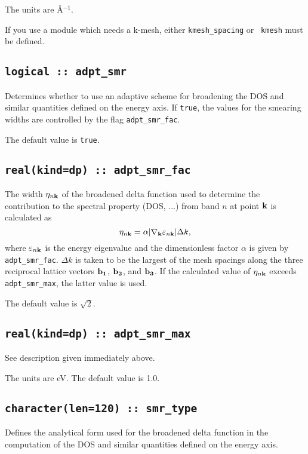 The units are \AA$^{-1}$.

If you use a module which needs a k-mesh, either {\tt kmesh\_spacing} or {\tt
  kmesh} must be defined.

\subsection[adpt\_smr]{\tt logical :: adpt\_smr}
Determines whether to use an adaptive scheme for broadening the
DOS and similar quantities defined on the energy axis.
If \verb#true#, the values for the smearing widths are 
controlled by the flag {\tt adpt\_smr\_fac}.

The default value is \verb#true#.

\subsection[adpt\_smr\_fac]{\tt real(kind=dp) :: adpt\_smr\_fac}

The width $\eta_{n{\bf k}}$ of the broadened delta function used to
determine the contribution to the spectral property (DOS, ...) from
band $n$ at point ${\bf k}$ is calculated as
%
$$
\eta_{n{\bf k}}=\alpha\vert \nabla_{\bf k}
\varepsilon_{n{\bf k}}\vert \Delta k,
$$ 
%
where $\varepsilon_{n{\bf k}}$ is the energy eigenvalue and the
dimensionless factor $\alpha$ is given by {\tt
  adpt\_smr\_fac}. $\Delta k$ is taken to be the largest of the mesh
spacings along the three reciprocal lattice vectors ${\bf b_1}$, ${\bf
  b_2}$, and ${\bf b_3}$.  If the calculated value of $\eta_{n{\bf
    k}}$ exceeds {\tt adpt\_smr\_max}, the latter value is used.

The default value is $\sqrt{2}$.

\subsection[adpt\_smr\_max]{\tt real(kind=dp) ::
  adpt\_smr\_max}

See description given immediately above.

The units are eV. The default value is 1.0.

\subsection[smr\_type]{\tt  character(len=120) :: smr\_type}

Defines the analytical form used for the broadened delta function in
the computation of the DOS and similar quantities defined on the
energy axis.


